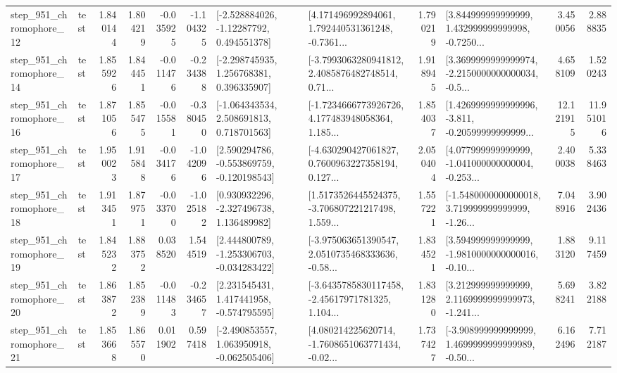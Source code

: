 \begin{tabular}{llrrrrllrlrr}
  step\_951\_chromophore\_12 &      test &      1.840144 &    1.804219 &     -0.035925 & -1.104325 &    [-2.528884026, -1.12287792, 0.494551378] &  [4.171496992894061, 1.792440531361248, -0.7361... &       1.790219 &  [3.844999999999999, 1.432999999999998, -0.7250... &            3.450056 &          2.888835 \\
  step\_951\_chromophore\_14 &      test &      1.855926 &    1.844451 &     -0.011476 & -0.234388 &    [-2.298745935, 1.256768381, 0.396335907] &  [-3.7993063280941812, 2.4085876482748514, 0.71... &       1.918945 &  [3.3699999999999974, -2.2150000000000034, -0.5... &            4.658109 &          1.520243 \\
  step\_951\_chromophore\_16 &      test &      1.871056 &    1.855475 &     -0.015581 & -0.380450 &    [-1.064343534, 2.508691813, 0.718701563] &  [-1.7234666773926726, 4.177483948058364, 1.185... &       1.854037 &  [1.4269999999999996, -3.811, -0.20599999999999... &           12.121915 &         11.951016 \\
  step\_951\_chromophore\_17 &      test &      1.950023 &    1.915848 &     -0.034176 & -1.042096 &   [2.590294786, -0.553869759, -0.120198543] &  [-4.630290427061827, 0.7600963227358194, 0.127... &       2.050404 &  [4.077999999999999, -1.041000000000004, -0.253... &            2.400038 &          5.338463 \\
  step\_951\_chromophore\_18 &      test &      1.913451 &    1.879751 &     -0.033700 & -1.025182 &    [0.930932296, -2.327496738, 1.136489982] &  [1.5173526445524375, -3.706807221217498, 1.559... &       1.557221 &  [-1.5480000000000018, 3.719999999999999, -1.26... &            7.048916 &          3.902436 \\
  step\_951\_chromophore\_19 &      test &      1.845232 &    1.883752 &      0.038520 &  1.544519 &   [2.444800789, -1.253306703, -0.034283422] &  [-3.975063651390547, 2.0510735468333636, -0.58... &       1.834521 &  [3.594999999999999, -1.9810000000000016, -0.10... &            1.883120 &          9.117459 \\
  step\_951\_chromophore\_20 &      test &      1.863872 &    1.852389 &     -0.011483 & -0.234657 &    [2.231545431, 1.417441958, -0.574795595] &  [-3.6435785830117458, -2.45617971781325, 1.104... &       1.831280 &  [3.212999999999999, 2.1169999999999973, -1.241... &            5.698241 &          3.822188 \\
  step\_951\_chromophore\_21 &      test &      1.853668 &    1.865570 &      0.011902 &  0.597418 &   [-2.490853557, 1.063950918, -0.062505406] &  [4.080214225620714, -1.7608651063771434, -0.02... &       1.737427 &  [-3.908999999999999, 1.4699999999999989, -0.50... &            6.162496 &          7.712187 \\

\end{tabular}
